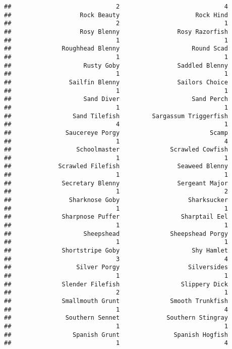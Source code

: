 \documentclass[
]{article}
\begin{document}
\begin{verbatim}
##                             2                             4 
##                   Rock Beauty                     Rock Hind 
##                             2                             1 
##                   Rosy Blenny                Rosy Razorfish 
##                             1                             1 
##              Roughhead Blenny                    Round Scad 
##                             1                             1 
##                    Rusty Goby                Saddled Blenny 
##                             1                             1 
##                Sailfin Blenny                Sailors Choice 
##                             1                             1 
##                    Sand Diver                    Sand Perch 
##                             1                             1 
##                 Sand Tilefish         Sargassum Triggerfish 
##                             4                             1 
##               Saucereye Porgy                         Scamp 
##                             1                             4 
##                  Schoolmaster              Scrawled Cowfish 
##                             1                             1 
##             Scrawled Filefish                Seaweed Blenny 
##                             1                             1 
##              Secretary Blenny                Sergeant Major 
##                             1                             2 
##                Sharknose Goby                   Sharksucker 
##                             1                             1 
##              Sharpnose Puffer                 Sharptail Eel 
##                             1                             1 
##                    Sheepshead              Sheepshead Porgy 
##                             1                             1 
##              Shortstripe Goby                    Shy Hamlet 
##                             3                             4 
##                  Silver Porgy                   Silversides 
##                             1                             1 
##              Slender Filefish                 Slippery Dick 
##                             2                             1 
##              Smallmouth Grunt              Smooth Trunkfish 
##                             1                             4 
##               Southern Sennet             Southern Stingray 
##                             1                             1 
##                 Spanish Grunt               Spanish Hogfish 
##                             1                             4 

\end{verbatim}
\end{document}
